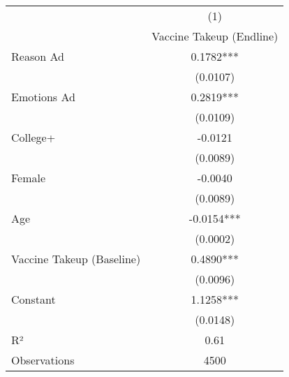 {
\def\sym#1{\ifmmode^{#1}\else\(^{#1}\)\fi}
\begin{tabular}{l*{1}{c}}
\hline\hline
                    &\multicolumn{1}{c}{(1)}\\
                    &\multicolumn{1}{c}{Vaccine Takeup (Endline)}\\
\hline
Reason Ad           &      0.1782***\\
                    &    (0.0107)   \\
Emotions Ad         &      0.2819***\\
                    &    (0.0109)   \\
College+            &     -0.0121   \\
                    &    (0.0089)   \\
Female              &     -0.0040   \\
                    &    (0.0089)   \\
Age                 &     -0.0154***\\
                    &    (0.0002)   \\
Vaccine Takeup (Baseline)&      0.4890***\\
                    &    (0.0096)   \\
Constant            &      1.1258***\\
                    &    (0.0148)   \\
\hline
R²                  &        0.61   \\
Observations        &        4500   \\
\hline\hline
\end{tabular}
}
